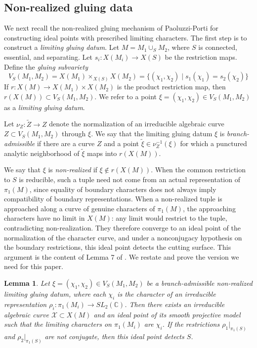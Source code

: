 \documentclass{article}
\theoremstyle{plain}
\theoremstyle{definition}
\theoremstyle{plain}
\theoremstyle{plain}
\theoremstyle{plain}
\newtheorem{lemma}[theorem]{Lemma}
\theoremstyle{remark}
\theoremstyle{remark}
\theoremstyle{plain}
\theoremstyle{plain}
\theoremstyle{plain}
\theoremstyle{plain}
\begin{document}
\subsection{Non-realized gluing data}

We next recall the non-realized gluing mechanism of Paoluzzi-Porti \cite{paoluzziporti} for constructing ideal points with prescribed limiting characters. The first step is to construct a \emph{limiting gluing datum}. Let $M = M_1 \cup_S M_2$, where $S$ is connected, essential, and separating. Let $s_i: X(M_i) \to X(S)$ be the restriction maps. Define the \emph{gluing subvariety}
\begin{equation*}
	V_S(M_1, M_2) = X(M_1) \times_{X(S)}X(M_2) = \{(\chi_1, \chi_2) \mid s_1(\chi_1) = s_2(\chi_2)\}
\end{equation*}
If $r: X(M) \to X(M_1) \times X(M_2)$ is the product restriction map, then $r(X(M)) \subset V_S(M_1, M_2)$. We refer to a point $\xi = (\chi_1, \chi_2) \in V_S(M_1, M_2)$ as a \emph{limiting gluing datum}.

\medskip

Let $\nu_Z: \widetilde Z \to Z$ denote the normalization of an irreducible algebraic curve $Z \subset V_S(M_1, M_2)$ through $\xi$. We say that the limiting gluing datum $\xi$ is \emph{branch-admissible} if there are a curve $Z$ and a point $\widetilde\xi \in \nu_Z^{-1}(\xi)$ for which a punctured analytic neighborhood of $\widetilde\xi$ maps into $r(X(M))$. 

\medskip

We say that $\xi$ is \emph{non-realized} if $\xi \notin r(X(M))$. When the common restriction to $S$ is reducible, such a tuple need not come from an actual representation of $\pi_1(M)$, since equality of boundary characters does not always imply compatibility of boundary representations. When a non-realized tuple is approached along a curve of genuine characters of $\pi_1(M)$, the approaching characters have no limit in $X(M)$: any limit would restrict to the tuple, contradicting non-realization. They therefore converge to an ideal point of the normalization of the character curve, and under a nonconjugacy hypothesis on the boundary restrictions, this ideal point detects the cutting surface. This argument is the content of Lemma 7 of \cite{paoluzziporti}. We restate and prove the version we need for this paper.

\begin{lemma}\label{lma:detection}
Let $\xi = (\chi_1, \chi_2) \in V_S(M_1, M_2)$ be a branch-admissible non-realized limiting gluing datum, where each $\chi_i$ is the character of an irreducible representation $\rho_i: \pi_1(M_i) \to SL_2(\mathbb{C})$. Then there exists an irreducible algebraic curve $\mathcal X \subset X(M)$ and an ideal point of its smooth projective model such that the limiting characters on $\pi_1(M_i)$ are $\chi_i$. If the restrictions $\rho_1|_{\pi_1(S)}$ and $\rho_2|_{\pi_1(S)}$ are not conjugate, then this ideal point detects $S$.
\end{lemma}
\end{document}
